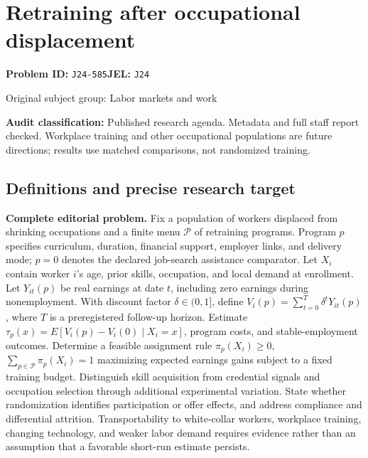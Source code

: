 \documentclass[11pt,a4paper]{article}
\begin{document}
\section*{Retraining after occupational displacement}
\textbf{Problem ID:} \texttt{J24-585}\quad \textbf{JEL:} \texttt{J24}\par
\label{problem:OP-0353}
{\sffamily\small\color{muted}Original subject group: Labor markets and work\par}
\label{definitions:problem:30007635}
\textbf{Audit classification:} Published research agenda. Metadata and full staff report checked. Workplace training and other occupational populations are future directions; results use matched comparisons, not randomized training.
\subsection*{Definitions and precise research target}
\textbf{Complete editorial problem.} Fix a population of workers displaced from shrinking occupations and a finite menu \(\mathcal P\) of retraining programs. Program \(p\) specifies curriculum, duration, financial support, employer links, and delivery mode; \(p=0\) denotes the declared job-search assistance comparator. Let \(X_i\) contain worker \(i\)'s age, prior skills, occupation, and local demand at enrollment. Let \(Y_{it}(p)\) be real earnings at date \(t\), including zero earnings during nonemployment. With discount factor \(\delta\in(0,1]\), define \(V_i(p)=\sum_{t=0}^{T}\delta^tY_{it}(p)\), where \(T\) is a preregistered follow-up horizon. Estimate \(\tau_p(x)=E[V_i(p)-V_i(0)\mid X_i=x]\), program costs, and stable-employment outcomes. Determine a feasible assignment rule \(\pi_p(X_i)\ge0\), \(\sum_{p\in\mathcal P}\pi_p(X_i)=1\) maximizing expected earnings gains subject to a fixed training budget. Distinguish skill acquisition from credential signals and occupation selection through additional experimental variation. State whether randomization identifies participation or offer effects, and address compliance and differential attrition. Transportability to white-collar workers, workplace training, changing technology, and weaker labor demand requires evidence rather than an assumption that a favorable short-run estimate persists.
\end{document}
